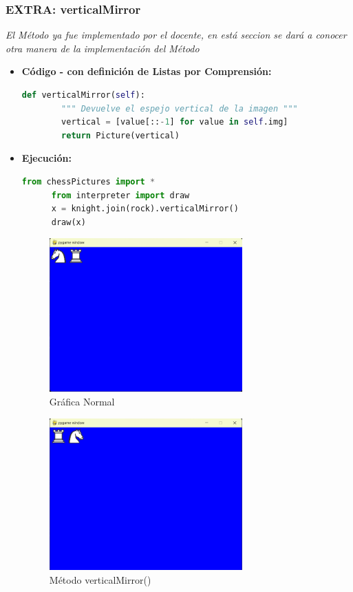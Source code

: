 \documentclass{article}
\begin{document}

  \subsubsection{EXTRA: verticalMirror}
  \textit{El Método ya fue implementado por el docente, en está seccion se dará a conocer otra manera de la implementación del Método}
  \begin{itemize}
    \item \textbf{Código - con definición de Listas por Comprensión:}
    \begin{lstlisting}[language=Python, caption=Método verticalMirror()]
      def verticalMirror(self):
        """ Devuelve el espejo vertical de la imagen """
        vertical = [value[::-1] for value in self.img]
        return Picture(vertical)
    \end{lstlisting}
    \item \textbf{Ejecución:}
    \begin{lstlisting}[language=Python, caption=Prueba verticalMirror()]
      from chessPictures import *
      from interpreter import draw
      x = knight.join(rock).verticalMirror()
      draw(x)
    \end{lstlisting}
    \begin{figure}[H]
      \centering
      \includegraphics[width=0.7\textwidth, keepaspectratio]{img/normalv.png}
      \caption{Gráfica Normal}
    \end{figure}
    \begin{figure}[H]
      \centering
      \includegraphics[width=0.7\textwidth, keepaspectratio]{img/vMirror.png}
      \caption{Método verticalMirror()}
    \end{figure}
  \end{itemize}
\end{document}
